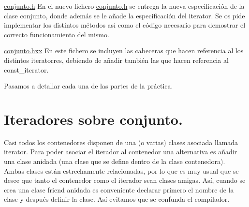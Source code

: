\begin{DoxyItemize}
\item \hyperlink{conjunto_8h_source}{conjunto.\-h} En el nuevo fichero \hyperlink{conjunto_8h_source}{conjunto.\-h} se entrega la nueva especificación de la clase conjunto, donde además se le añade la especificación del iterator. Se os pide implementar los distintos métodos así como el código necesario para demostrar el correcto funcionamiento del mismo. \item \hyperlink{conjunto_8hxx_source}{conjunto.\-hxx} En este fichero se incluyen las cabeceras que hacen referencia al los distintos iteratorres, debiendo de añadir también las que hacen referencia al const\-\_\-iterator.\end{DoxyItemize}
Pasamos a detallar cada una de las partes de la práctica.\hypertarget{index_iterar}{}\section{Iteradores sobre conjunto.}\label{index_iterar}
Casi todos los contenedores disponen de una (o varias) clases asociada llamada iterator. Para poder asociar el iterador al contenedor una alternativa es añadir una clase anidada (una clase que se define dentro de la clase contenedora). Ambas clases están estrechamente relacionadas, por lo que es muy usual que se desee que tanto el contenedor como el iterador sean clases amigas. Así, cuando se crea una clase friend anidada es conveniente declarar primero el nombre de la clase y después definir la clase. Así evitamos que se confunda el compilador.


